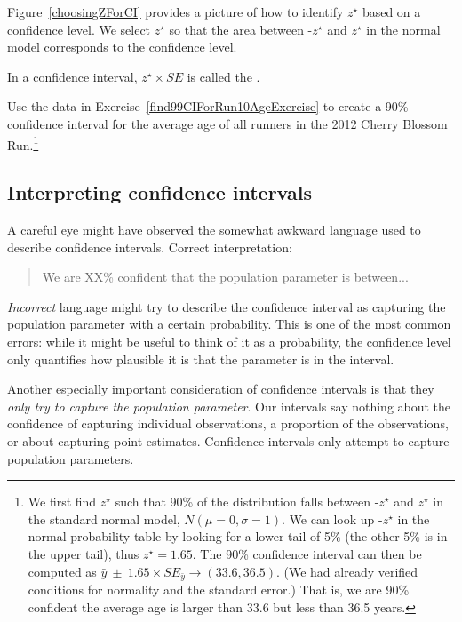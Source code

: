Figure~\ref{choosingZForCI} provides a picture of how to identify $z^{\star}$ based on a confidence level. We select $z^{\star}$ so that the area between -$z^{\star}$ and $z^{\star}$ in the normal model corresponds to the confidence level. 

\begin{termBox}{
\label{marginOfErrorTermBox}In a confidence interval, $z^{\star}\times SE$ is called the .}
\end{termBox}

\begin{exercise} \label{find90CIForRun10AgeExercise}
Use the data in Exercise~\ref{find99CIForRun10AgeExercise} to create a 90\% confidence interval for the average age of all runners in the 2012 Cherry Blossom Run.\footnote{We first find $z^{\star}$ such that 90\% of the distribution falls between -$z^{\star}$ and $z^{\star}$ in the standard normal model, $N(\mu=0, \sigma=1)$. We can look up -$z^{\star}$ in the normal probability table by looking for a lower tail of 5\% (the other 5\% is in the upper tail), thus $z^{\star}=1.65$. The 90\% confidence interval can then be computed as $\bar{y}\ \pm\ 1.65\times SE_{\bar{y}} \to (33.6, 36.5)$. (We had already verified conditions for normality and the standard error.) That is, we are 90\% confident the average age is larger than 33.6 but less than 36.5 years.}
\end{exercise}

\subsection{Interpreting confidence intervals}
\label{interpretingCIs}


A careful eye might have observed the somewhat awkward language used to describe confidence intervals. Correct interpretation:
\begin{quote}
We are XX\% confident that the population parameter is between...
\end{quote}
\emph{Incorrect} language might try to describe the confidence interval as capturing the population parameter with a certain probability. This is one of the most common errors: while it might be useful to think of it as a probability, the confidence level only quantifies how plausible it is that the parameter is in the interval.

Another especially important consideration of confidence intervals is that they \emph{only try to capture the population parameter}. Our intervals say nothing about the confidence of capturing individual observations, a proportion of the observations, or about capturing point estimates. Confidence intervals only attempt to capture population parameters.

